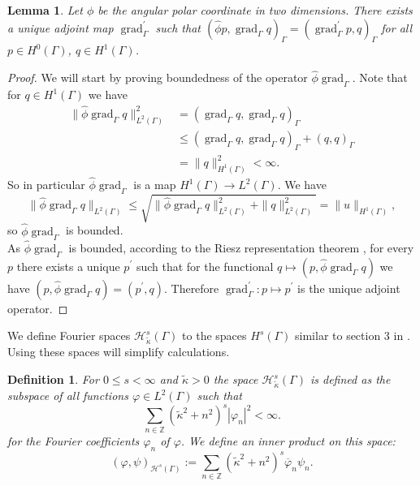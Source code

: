 \documentclass[12pt,journal,compsoc, onecolumn]{IEEEtran}
\newtheorem{lemma}[theorem]{Lemma}
\newtheorem{definition}[theorem]{Definition}
\begin{document}
\begin{lemma}
\label{lem:b_simplify}
    Let $\phi$ be the angular polar coordinate in two dimensions.
    There exists a unique adjoint map $\operatorname{grad}_{\Gamma}^\prime$ such that 
    $\left( \hat{\phi} p, \operatorname{grad}_{\Gamma} q\right)_{\Gamma} = 
    \left( \operatorname{grad}^\prime_{\Gamma} p, q\right)_{\Gamma}$ 
    for all $p \in H^0(\Gamma)$, $q \in H^1(\Gamma)$.
\end{lemma}
\begin{proof}
We will start by proving boundedness of the  operator $\hat{\phi}\operatorname{grad}_{\Gamma}$.
Note that for $q \in H^1(\Gamma)$ we have 
\begin{align} 
    \|\hat{\phi}\operatorname{grad}_{\Gamma}q\|_{L^2(\Gamma)}^2 &= (\operatorname{grad}_{\Gamma}q,  \operatorname{grad}_{\Gamma}q)_{\Gamma} \nonumber \\ 
    &\leq (\operatorname{grad}_{\Gamma}q,  \operatorname{grad}_{\Gamma}q)_{\Gamma} + (q,  q)_{\Gamma} \nonumber \\ 
    &= \|q\|_{H^1(\Gamma)}^2 < \infty \nonumber.
\end{align}
So in particular $\hat{\phi}\operatorname{grad}_{\Gamma}$ is a map $H^1(\Gamma) \rightarrow L^2(\Gamma)$. We have $$\|\hat{\phi}\operatorname{grad}_{\Gamma}q\|_{L^2(\Gamma)} \leq \sqrt{\|\hat{\phi}\operatorname{grad}_{\Gamma}q\|_{L^2(\Gamma)}^2 + \|q\|_{L^2(\Gamma)}^2} = \|u\|_{H^1(\Gamma)},$$ so $\hat{\phi} \operatorname{grad}_{\Gamma}$ is bounded. \\
As $\hat{\phi}\operatorname{grad}_{\Gamma}$ is bounded, according to the Riesz representation theorem \cite{rudin2008function}, for every $p$ there exists a unique $p^\prime$ such that for the functional $q \mapsto (p, \hat{\phi}\operatorname{grad}_{\Gamma}q)$ we have $(p, \hat{\phi}\operatorname{grad}_{\Gamma}q) = (p^\prime, q)$. Therefore $\operatorname{grad}_{\Gamma}^\prime: p \mapsto p^\prime$ is the unique adjoint operator. 
\end{proof}  \noindent
We define Fourier spaces  $\mathcal{H}^s_{\tilde \kappa}(\Gamma)$ to the spaces ${H}^s(\Gamma)$ similar to section 3 in \cite{amini1998preconditioned}. Using these spaces will simplify calculations.
\begin{definition} 
    \label{def:fouier_sobolev}
    For \(0 \leq s<\infty\) and $\tilde \kappa> 0$ the space \(\mathcal{H}^{s}_{\tilde \kappa}(\Gamma)\) is defined as the subspace of all functions $\varphi \in L^{2}(\Gamma)$
    such that
    $$
    \sum\limits_{n \in \mathbb{Z}}\left(\tilde \kappa^2+n^{2}\right)^{s}\left|\varphi_{n}\right|^{2}<\infty. 
    $$
    for the Fourier coefficients \(\varphi_{n}\) of \(\varphi\). We define an inner product on this space:
    $$
    (\varphi, \psi)_{\mathcal{H}^{s}(\Gamma)}:=\sum_{n \in \mathbb{Z}}\left(\tilde \kappa^2+n^{2}\right)^{s} \overline{\varphi}_{n} {\psi_{n}}.
    $$
\end{definition}  \noindent
\end{document}
